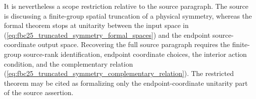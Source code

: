 \documentclass{article}
\begin{document}
It is nevertheless a scope restriction relative to the source paragraph.
The source is discussing a finite-group spatial truncation of a physical
symmetry, whereas the formal theorem stops at unitarity between the input
space in (\ref{eq:fbc25_truncated_symmetry_formal_spaces}) and the endpoint
source-coordinate output space. Recovering the full source paragraph requires
the finite-group source-rank identification, endpoint coordinate choices, the
interior action condition, and the complementary relation
(\ref{eq:fbc25_truncated_symmetry_complementary_relation}). The restricted
theorem may be cited as formalizing only the endpoint-coordinate unitarity
part of the source assertion.



\end{document}
